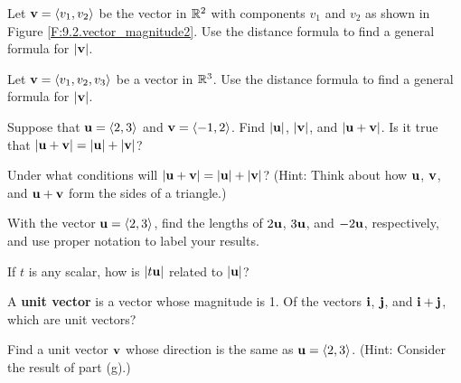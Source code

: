 \begin{activity}
	\item Let $\mathbf{v} = \langle v_1, v_2 \rangle$ be the vector in $\mathbb{R}^2$ with components $v_1$ and $v_2$ as shown in Figure \ref{F:9.2.vector_magnitude2}. Use the distance formula to find a general formula for $|\mathbf{v}|$.


	\item Let $\mathbf{v} = \langle v_1, v_2, v_3 \rangle$ be a vector in $\mathbb{R}^3$. Use the distance formula to find a general formula for $|\mathbf{v}|$.

        \item Suppose that $\mathbf{u} = \langle 2,3\rangle$ and $\mathbf{v} =
          \langle -1,2\rangle$.  Find $|\mathbf{u}|$, $|\mathbf{v}|$, and
          $|\mathbf{u}+\mathbf{v}|$.  Is it true that $|\mathbf{u} + \mathbf{v}| = |\mathbf{u}|+|\mathbf{v}|$?

        \item Under what conditions will $|\mathbf{u}+\mathbf{v}| = |\mathbf{u}|+|\mathbf{v}|$? (Hint: Think about how $\mathbf{u}$, $\mathbf{v}$, and $\mathbf{u}+\mathbf{v}$ form the sides of a triangle.)

        \item With the vector $\mathbf{u} = \langle 2,3\rangle$, find the
          lengths of $2\mathbf{u}$, $3\mathbf{u}$, and $-2\mathbf{u}$, respectively, and use proper notation to label your results.  

        \item If $t$ is any scalar, how is $|t\mathbf{u}|$
          related to $|\mathbf{u}|$?

        \item A {\bf unit vector} is a vector whose magnitude is 1.
          Of the vectors ${\bf i}$, ${\bf j}$, and ${\bf i} + {\bf
            j}$, which are unit vectors?

        \item Find a unit vector $\mathbf{v}$ whose direction is the same as
          $\mathbf{u} = \langle 2, 3\rangle$. (Hint: Consider the result of part (g).)


	\ea


\end{activity}
\begin{smallhint}

\end{smallhint}
\begin{bighint}

\end{bighint}
